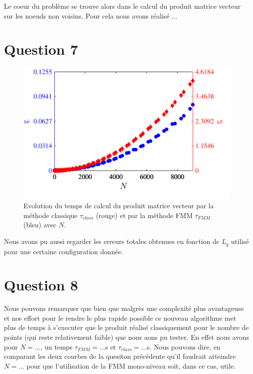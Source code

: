 \documentclass[10pt]{article}
\begin{document}
\begin{multicols}{2}
Le coeur du problème se trouve alors dans le calcul du produit matrice vecteur sur les noeuds non voisins. Pour cela nous avons réalisé ...


\vspace*{22pt}

\section*{Question 7}


\begin{figure}[H]
  \begin{center}
  \includegraphics[width=0.95\columnwidth]{Q2a_4.pdf}
  \vspace*{-11pt}
  \caption{Evolution du temps de calcul du produit matrice vecteur par la méthode classique $\tau_{class}$ (rouge) et par la méthode FMM $\tau_{FMM}$ (bleu) avec $N$.}
  \label{fig:Q7a}
  \end{center}
\end{figure}
\vspace*{-22pt}

Nous avons pu aussi regarder les erreurs totales obtenues en fonction de $L_q$ utilisé pour une certaine configuration donnée. 


\vspace*{22pt}
\section*{Question 8}

Nous pouvons remarquer que bien que malgrès une complexité plus avantageuse et nos effort pour le rendre le plus rapide possible ce nouveau algorithme met plus de temps à s'executer que le produit réalisé classiquement pour le nombre de points (qui reste relativement faible) que nous aons pu tester. En effet nous avons pour $N = ...$, un temps $\tau_{FMM} = ... $s et $\tau_{class} = ... $s. Nous pouvons dire, en comparant les deux courbes de la quesiton précédente qu'il faudrait atteindre $N = ...$ pour que l'utilisation de la FMM mono-niveau soit, dans ce cas, utile. 



\end{multicols}
\end{document}

